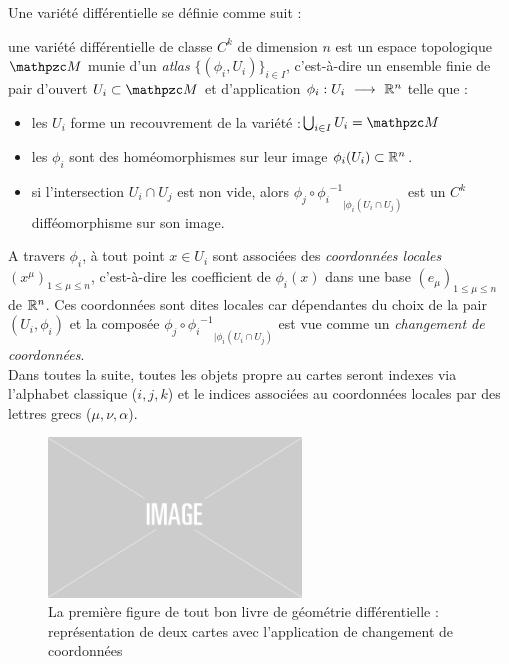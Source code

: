 Une variété différentielle se définie comme suit :
\begin{definition} \label{defvarietoche}
	une variété différentielle de classe $C^k$ de dimension $n$ est un espace topologique
	$\manu$ munie d'un \emph{atlas} $\big\{ (\phi_i, U_i) \big\}_{i\in I}$, c'est-à-dire un ensemble finie de pair d'ouvert $U_i\subset \manu$ et d'application $\phi_i :U_i\ \longrightarrow\ \mathbb{R}^n$ telle que :
	\begin{itemize}
		
		\item les $U_i$ forme un recouvrement de la variété :\qquad $\bigcup_{i\in I} U_i = \manu$
		
		\item les $\phi_i$ sont des homéomorphismes sur leur image $\phi_i(U_i)\subset\mathbb{R}^n$.
		
		\item si l'intersection $U_i \cap U_j$ est non vide, alors ${\phi_j \circ {\phi_i}^{-1}}_{| {\phi_i}(U_i\cap U_j)}$ est un $C^k$ difféomorphisme sur son image.
		
	\end{itemize}
	A travers $\phi_i$, à tout point $x\in U_i$ sont associées des \emph{coordonnées locales} $(x^\mu)_{1\leq \mu\leq n}$, c'est-à-dire les coefficient de $\phi_i(x)$ dans une base $(e_\mu)_{1\leq \mu\leq n}$ de $\mathbb{R}^n$. Ces coordonnées sont dites locales car dépendantes du choix de la pair $(U_i,\phi_i)$ et la composée ${\phi_j \circ {\phi_i}^{-1}}_{| {\phi_i}(U_i\cap U_j)}$ est vue comme un \emph{changement de coordonnées}.\\
	Dans toutes la suite, toutes les objets propre au cartes seront indexes via l'alphabet classique ($i,j,k$) et le indices associées au coordonnées locales par des lettres grecs ($\mu,\nu,\alpha$).
\end{definition}

\begin{figure}[h]
	\includegraphics[width=0.6\textwidth]{fig/placeholder}
	\caption[La première figure de tout bon livre de géométrie différentielle]{La première figure de tout bon livre de géométrie différentielle : représentation de deux cartes avec l'application de changement de coordonnées}
\end{figure}


